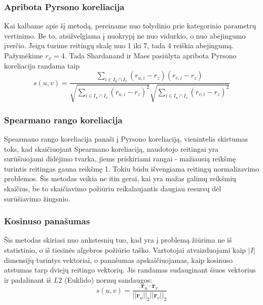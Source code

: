 \documentclass{VUMIFInfMagistrinis}
\begin{document}
	\subsubsection{Apribota Pyrsono koreliacija}
	Kai kalbame apie šį metodą, pereiname nuo tolydinio prie kategorinio parametrų vertinimo. Be to, atsižvelgiama į nuokrypį ne nuo vidurkio, o nuo abejingumo įverčio. Jeigu turime reitingų skalę nuo 1 iki 7, tada 4 reiškia abejingumą. Pažymėkime $r_x = 4$. Tada Shardanand ir Maes pasiūlyta apribota Pyrsono koreliacija randama taip
	\begin{equation}
	s(u,v) = \frac{\sum \limits_{i\in I_u \cap I_v }(r_{u,i}-r_z)(r_{v,i}-r_z)}{\sqrt{\sum\limits_{i \in I_u \cap I_v }(r_{u,i} - r_z)^2}\sqrt{\sum\limits_{i \in I_u \cap I_v }(r_{v,i} - r_z)^2}}
	\end{equation}
\subsubsection{Spearmano rango koreliacija}
	Spearmano rango koreliacija panaši į Pyrsono koreliaciją, vienintelis skirtumas toks, kad skaičiuojant Spearmano koreliaciją, naudotojo reitingai yra surūšiuojami didėjimo tvarka, jiems priskiriami rangai - mažiausią reikšmę turintis reitingas gauna reikšmę 1. Tokiu būdu išvengiama reitingų normalizavimo problemos. Šis metodas veikia ne itin gerai, kai yra mažas galimų reikšmių skaičius, be to skaičiavimo požiūriu reikalaujantis daugiau resursų dėl surūšiavimo žingsnio.
\subsubsection{Kosinuso panašumas}
	Šis metodas skiriasi nuo ankstesnių tuo, kad yra į problemą žiūrima ne iš statistinio, o iš tiesinės algebros požiūrio taško. Vartotojai atvaizduojami kaip $|I|$ dimensijų turintys vektoriai, o panašumas apskaičiuojamas, kaip kosinuso atstumas tarp dviejų reitingo vektorių. Jis randamas sudauginant šiuos vektorius ir padalinant iš $L2$ (Euklido) normų sandaugos:
	\begin{equation}
	s(u,v) = \frac{\boldsymbol{r}_u \cdot \boldsymbol{r}_v}{||\boldsymbol{r}_u||_2 ||\boldsymbol{r}_v||_2}
	\end{equation}
\end{document}
